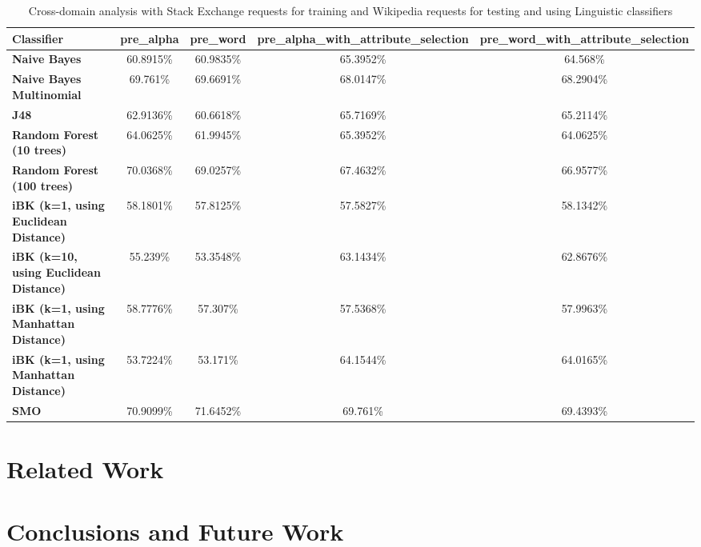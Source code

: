 \documentclass[conference]{IEEEtran}
\begin{document}
\begin{table*}[htbp]
\caption{Cross-domain analysis with Stack Exchange requests for training and Wikipedia requests for testing and using Linguistic classifiers }
\centering
\vspace{5pt}
\begin{tabular}{|l|c|c|c|c|}
\hline
\textbf{Classifier} & \textbf{pre\_alpha} & \textbf{pre\_word} & \textbf{pre\_alpha\_with\_attribute\_selection} & \textbf{pre\_word\_with\_attribute\_selection} \\
\hline\hline
\textbf{Naive Bayes} & 60.8915\% & 60.9835\% & 65.3952\% & 64.568\% \\ 
\hline
\textbf{Naive Bayes Multinomial} & 69.761\% & 69.6691\% & 68.0147\% & 68.2904\% \\ 
\hline
\textbf{J48} & 62.9136\% & 60.6618\% & 65.7169\% & 65.2114\% \\ 
\hline
\textbf{Random Forest (10 trees)} & 64.0625\% & 61.9945\% & 65.3952\% & 64.0625\% \\ 
\hline
\textbf{Random Forest (100 trees)} & 70.0368\% & 69.0257\% & 67.4632\% & 66.9577\% \\ 
\hline
\textbf{iBK (k=1, using Euclidean Distance)} & 58.1801\% & 57.8125\% & 57.5827\% & 58.1342\% \\ 
\hline
\textbf{iBK (k=10, using Euclidean Distance)} & 55.239\% & 53.3548\% & 63.1434\% & 62.8676\% \\ 
\hline
\textbf{iBK (k=1, using Manhattan Distance)} & 58.7776\% & 57.307\% & 57.5368\% & 57.9963\% \\ 
\hline
\textbf{iBK (k=1, using Manhattan Distance)} & 53.7224\% & 53.171\% & 64.1544\% & 64.0165\% \\ 
\hline
\textbf{SMO} & 70.9099\% & 71.6452\% & 69.761\% & 69.4393\% \\ 
\hline
\hline
\end{tabular}
\label{table:cross-domain-stack-Ling}
\end{table*}


\section{Related Work}

\section{Conclusions and Future Work}
\end{document}
